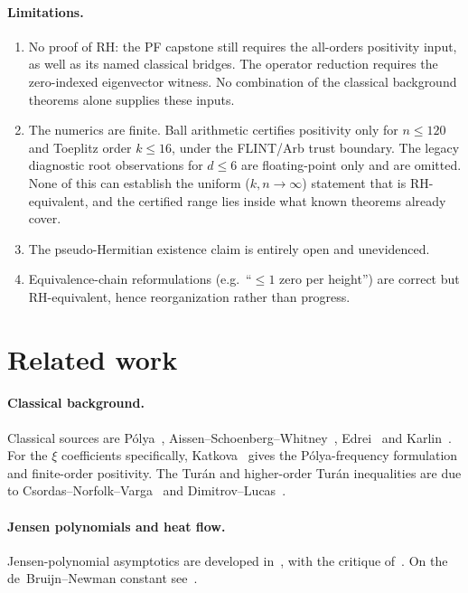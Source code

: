 \documentclass[11pt]{article}
\theoremstyle{plain}
\theoremstyle{definition}
\theoremstyle{remark}
\begin{document}
\paragraph{Limitations.}
\begin{enumerate}
  \item No proof of RH: the PF capstone still requires the all-orders
  positivity input, as well as its named classical bridges. The operator
  reduction requires the zero-indexed eigenvector witness. No combination
  of the classical background theorems alone supplies these inputs.
  \item The numerics are finite. Ball arithmetic certifies positivity only for $n\le120$
  and Toeplitz order $k\le16$, under the FLINT/Arb trust boundary. The legacy diagnostic
  root observations for $d\le6$ are floating-point only and are omitted. None of this can establish the
  uniform ($k,n\to\infty$) statement that is RH-equivalent, and the certified range
  lies inside what known theorems already cover.
  \item The pseudo-Hermitian existence claim is entirely open and unevidenced.
  \item Equivalence-chain reformulations (e.g.\ ``$\le 1$ zero per height'') are
  correct but RH-equivalent, hence reorganization rather than progress.
\end{enumerate}

\section{Related work}\label{sec:related}
\paragraph{Classical background.} Classical sources are Pólya~\cite{Polya1926,Polya1927},
Aissen--Schoenberg--Whitney~\cite{ASW1952}, Edrei~\cite{Edrei1953} and Karlin~\cite{Karlin1968}.
For the $\xi$ coefficients specifically, Katkova~\cite{Katkova2007} gives the
Pólya-frequency formulation and finite-order positivity. The Turán and higher-order Turán
inequalities are due to Csordas--Norfolk--Varga~\cite{CNV1986} and
Dimitrov--Lucas~\cite{DimitrovLucas2011}.

\paragraph{Jensen polynomials and heat flow.} Jensen-polynomial asymptotics are developed
in~\cite{GORZ2019,GORTTW}, with the critique of~\cite{Farmer2022}. On the de~Bruijn--Newman
constant see~\cite{RodgersTao2020,Polymath2019}.
\end{document}
